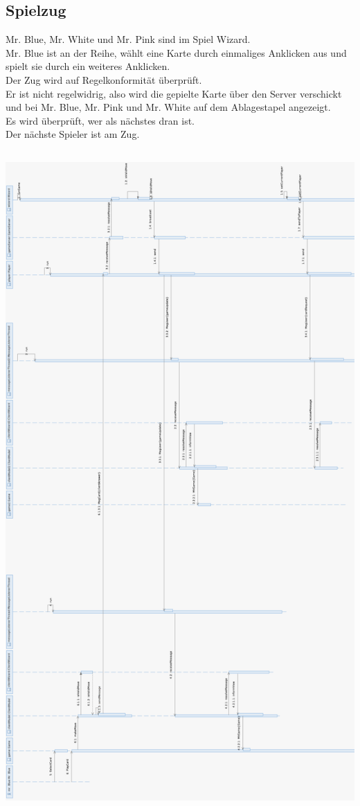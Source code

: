 \documentclass{article}
\begin{document}
\subsection{Spielzug}
		Mr. Blue, Mr. White und Mr. Pink sind im Spiel Wizard. \\
		Mr. Blue ist an der Reihe, wählt eine Karte durch einmaliges Anklicken aus und spielt sie durch ein weiteres Anklicken.\\
		Der Zug wird auf Regelkonformität überprüft.\\
		Er ist nicht regelwidrig, also wird die gepielte Karte über den Server verschickt und bei Mr. Blue, Mr. Pink und Mr. White auf dem Ablagestapel angezeigt. \\
		Es wird überprüft, wer als nächstes dran ist.\\
		Der nächste Spieler ist am Zug. \\
\newpage
\addtolength{\oddsidemargin}{-4cm}
\addtolength{\topmargin}{-4cm}
\includegraphics[width=18cm, height = 26cm]{Entwurf_PlayCard2}\\
\end{document}

